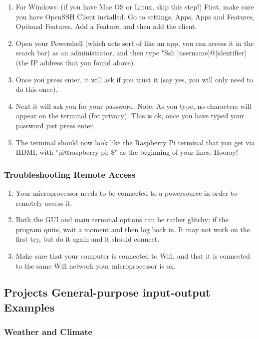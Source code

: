 \documentclass{article}\usepackage[]{graphicx}\usepackage[]{color}
\begin{document}
\begin{enumerate}

\item For Windows: (if you have Mac OS or Linux, skip this step!) First, make sure you have OpenSSH Client installed.  Go to settings, Apps, Apps and Features, Optional Features, Add a Feature, and then add the client.
\item Open your Powershell (which acts sort of like an app, you can access it in the search bar) as an administrator, and then type "Ssh [username]@[identifier] (the IP address that you found above).  
\item Once you press enter, it will ask if you trust it (say yes, you will only need to do this once). 
\item Next it will ask you for your password.  Note: As you type, no characters will appear on the terminal (for privacy).  This is ok, once you have typed your password just press enter.
\item The terminal should now look like the Raspberry Pi terminal that you get via HDMI, with "pi@raspberry pi: \$" as the beginning of your lines.  Hooray!

\end{enumerate}

\subsubsection{Troubleshooting Remote Access}

\begin {enumerate}
\item Your microprocessor needs to be connected to a powersource in order to remotely access it.
\item Both the GUI and main terminal options can be rather glitchy; if the program quits, wait a moment and then log back in.  It may not work on the first try, but do it again and it should connect.
\item Make sure that your computer is connected to Wifi, and that it is connected to the same Wifi network your microprocessor is on.

\end{enumerate}


\subsection{Projects General-purpose input-output Examples}

\subsubsection{Weather and Climate}
\end{document}
